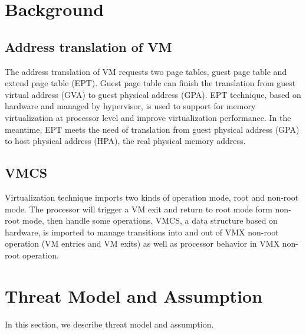 \documentclass[conference]{IEEEtran}
\begin{document}
\section{Background}
\subsection{Address translation of VM}
The address translation of VM requests two page tables, guest page table and extend page table (EPT). Guest page table can finish the translation from guest virtual address (GVA) to guest physical address (GPA). EPT technique, based on hardware and managed by hypervisor, is used to support for memory virtualization at processor level and improve virtualization performance. In the meantime, EPT meets the need of translation from guest physical address (GPA) to host physical address (HPA), the real physical memory address. 
\subsection{VMCS}
Virtualization technique imports two kinds of operation mode, root and non-root mode. The processor will trigger a VM exit and return to root mode form non-root mode, then handle some operations. VMCS, a data structure based on hardware, is imported to manage transitions into and out of VMX non-root operation (VM entries and VM exits) as well as processor behavior in VMX non-root operation.

\section{Threat Model and Assumption}

In this section, we describe threat model and assumption.
\end{document}
